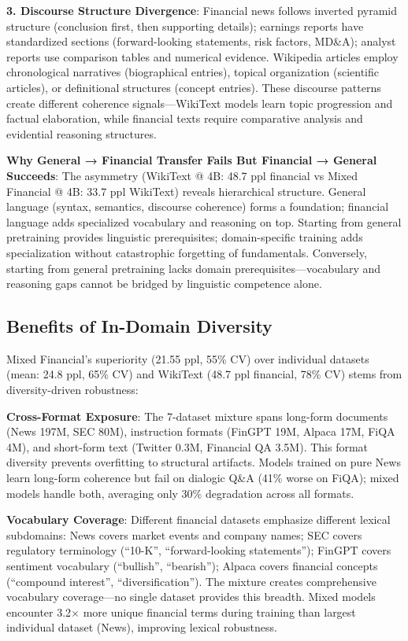 \textbf{3. Discourse Structure Divergence}: Financial news follows inverted pyramid structure (conclusion first, then supporting details); earnings reports have standardized sections (forward-looking statements, risk factors, MD\&A); analyst reports use comparison tables and numerical evidence. Wikipedia articles employ chronological narratives (biographical entries), topical organization (scientific articles), or definitional structures (concept entries). These discourse patterns create different coherence signals—WikiText models learn topic progression and factual elaboration, while financial texts require comparative analysis and evidential reasoning structures.

\textbf{Why General → Financial Transfer Fails But Financial → General Succeeds}: The asymmetry (WikiText @ 4B: 48.7 ppl financial vs Mixed Financial @ 4B: 33.7 ppl WikiText) reveals hierarchical structure. General language (syntax, semantics, discourse coherence) forms a foundation; financial language adds specialized vocabulary and reasoning on top. Starting from general pretraining provides linguistic prerequisites; domain-specific training adds specialization without catastrophic forgetting of fundamentals. Conversely, starting from general pretraining lacks domain prerequisites—vocabulary and reasoning gaps cannot be bridged by linguistic competence alone.

\subsection{Benefits of In-Domain Diversity}

Mixed Financial's superiority (21.55 ppl, 55\% CV) over individual datasets (mean: 24.8 ppl, 65\% CV) and WikiText (48.7 ppl financial, 78\% CV) stems from diversity-driven robustness:

\textbf{Cross-Format Exposure}: The 7-dataset mixture spans long-form documents (News 197M, SEC 80M), instruction formats (FinGPT 19M, Alpaca 17M, FiQA 4M), and short-form text (Twitter 0.3M, Financial QA 3.5M). This format diversity prevents overfitting to structural artifacts. Models trained on pure News learn long-form coherence but fail on dialogic Q\&A (41\% worse on FiQA); mixed models handle both, averaging only 30\% degradation across all formats.

\textbf{Vocabulary Coverage}: Different financial datasets emphasize different lexical subdomains: News covers market events and company names; SEC covers regulatory terminology (``10-K'', ``forward-looking statements''); FinGPT covers sentiment vocabulary (``bullish'', ``bearish''); Alpaca covers financial concepts (``compound interest'', ``diversification''). The mixture creates comprehensive vocabulary coverage—no single dataset provides this breadth. Mixed models encounter 3.2$\times$ more unique financial terms during training than largest individual dataset (News), improving lexical robustness.

